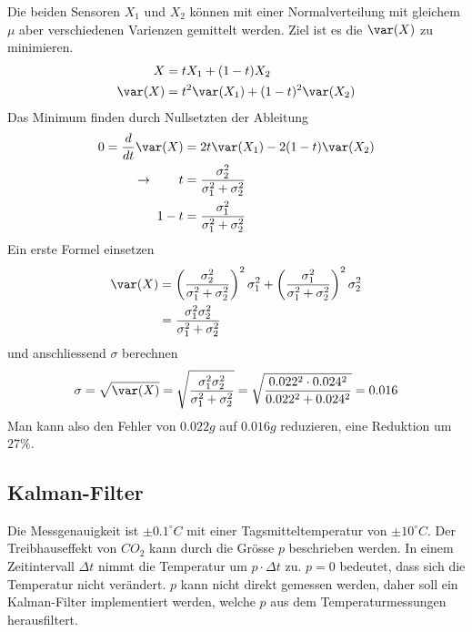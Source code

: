 Die beiden Sensoren $X_1$ und $X_2$ können mit einer Normalverteilung mit gleichem $\mu$ aber verschiedenen Varienzen gemittelt werden. Ziel ist es die $\var(X)$ zu minimieren. 
\begin{align*}
	X &= tX_1 + (1-t)X_2 \\
	\var(X) &= t^2\var(X_1) + (1-t)^2\var(X_2)
\end{align*}
Das Minimum finden durch Nullsetzten der Ableitung
\begin{align*}
	0 = \frac{d}{dt}\var(X) &= 2t\var(X_1) - 2(1-t)\var(X_2) \\
	\rightarrow  \qquad t &= \frac{\sigma_2^2}{\sigma_1^2 + \sigma_2^2} \\
	 1-t &= \frac{\sigma_1^2}{\sigma_1^2 + \sigma_2^2}
\end{align*}
Ein erste Formel einsetzen
\begin{align*}
	\var(X) &= \left(\frac{\sigma_2^2}{\sigma_1^2 + \sigma_2^2}\right)^2\sigma_1^2 + \left(\frac{\sigma_1^2}{\sigma_1^2 + \sigma_2^2}\right)^2\sigma_2^2 \\
	&= \frac{\sigma_1^2\sigma_2^2}{\sigma_1^2+\sigma_2^2}
\end{align*}
und anschliessend $\sigma$ berechnen
\[
\sigma = \sqrt{\var(X)} = \sqrt{\frac{\sigma_1^2\sigma_2^2}{\sigma_1^2+\sigma_2^2}} = \sqrt{\frac{0.022^2\cdot 0.024^2}{0.022^2 + 0.024^2}} = 0.016
\]  
Man kann also den Fehler von $0.022g$ auf $0.016g$ reduzieren, eine Reduktion um $27\%$.

\subsection{Kalman-Filter}\label{kalman}
Die Messgenauigkeit ist $\pm0.1^\circ C$ mit einer Tagsmitteltemperatur von $\pm10^\circ C$. Der Treibhauseffekt von $CO_2$ kann durch die Grösse $p$ beschrieben werden. In einem Zeitintervall $\Delta t$ nimmt die Temperatur
um $p \cdot \Delta t$ zu. $p=0$ bedeutet, dass sich die Temperatur nicht verändert. $p$ kann nicht direkt gemessen werden, daher soll ein Kalman-Filter implementiert werden, welche $p$ aus dem Temperaturmessungen herausfiltert.

